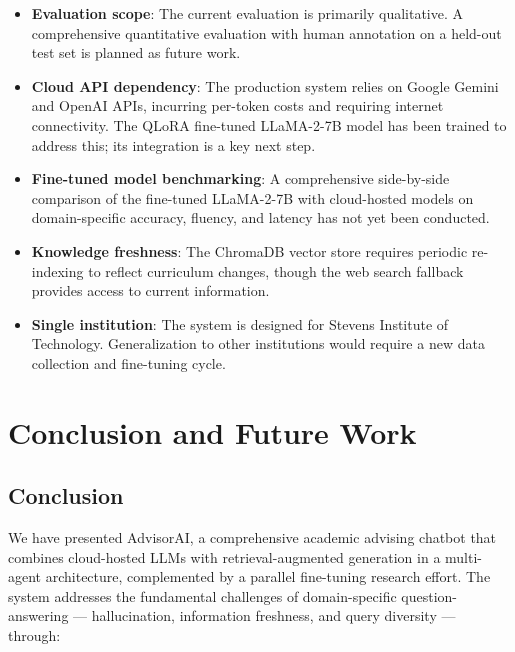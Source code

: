 \documentclass[conference,compsoc]{IEEEtran}
\begin{document}
\begin{itemize}
    \item \textbf{Evaluation scope}: The current evaluation is primarily qualitative. A comprehensive quantitative evaluation with human annotation on a held-out test set is planned as future work.
    \item \textbf{Cloud API dependency}: The production system relies on Google Gemini and OpenAI APIs, incurring per-token costs and requiring internet connectivity. The QLoRA fine-tuned LLaMA-2-7B model has been trained to address this; its integration is a key next step.
    \item \textbf{Fine-tuned model benchmarking}: A comprehensive side-by-side comparison of the fine-tuned LLaMA-2-7B with cloud-hosted models on domain-specific accuracy, fluency, and latency has not yet been conducted.
    \item \textbf{Knowledge freshness}: The ChromaDB vector store requires periodic re-indexing to reflect curriculum changes, though the web search fallback provides access to current information.
    \item \textbf{Single institution}: The system is designed for Stevens Institute of Technology. Generalization to other institutions would require a new data collection and fine-tuning cycle.
\end{itemize}

\section{Conclusion and Future Work}
\label{sec:conclusion}

\subsection{Conclusion}

We have presented AdvisorAI, a comprehensive academic advising chatbot that combines cloud-hosted LLMs with retrieval-augmented generation in a multi-agent architecture, complemented by a parallel fine-tuning research effort. The system addresses the fundamental challenges of domain-specific question-answering --- hallucination, information freshness, and query diversity --- through:
\end{document}
